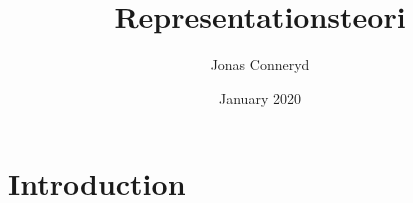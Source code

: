 \documentclass{article}
\title{Representationsteori}
\author{Jonas Conneryd}
\date{January 2020}
\begin{document}
\maketitle

\section{Introduction}
\end{document}
